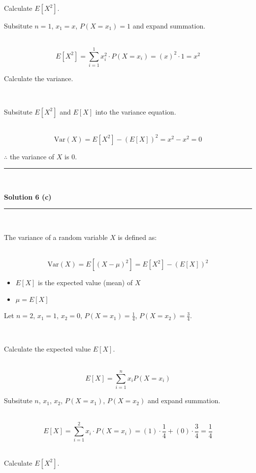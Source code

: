 \documentclass{article}
\begin{document}
\parbox{\textwidth}{Calculate $E[X^2]$.}

\parbox{\textwidth}{Subsitute $n=1$, $x_1=x$, $P(X = x_1) =1$ and expand summation.}\\

$$E[X^2] = \sum^1_{i=1} x_i^2 \cdot P(X = x_i) = (x)^2 \cdot 1 = x^2$$

\parbox{\textwidth}{Calculate the variance.}\\

\parbox{\textwidth}{Subsitute $E[X^2]$ and $E[X]$ into the variance equation.}\\

$$\text{Var}(X) = E[X^2] - (E[X])^2 = x^2 - x^2 = 0$$

\parbox{\textwidth}{$\therefore$ the variance of $X$ is 0.}

\noindent\rule{\textwidth}{0.4pt}\\

\newpage

\textbf{Solution 6 (c)}

\noindent\rule{\textwidth}{0.4pt}\\

\parbox{\textwidth}{The variance of a random variable $X$ is defined as:}\\

$$\text{Var}(X) = E[(X - \mu)^2] = E[X^2] - (E[X])^2$$

\begin{itemize}
    \item $E[X]$ is the expected value (mean) of $X$
    \item $\mu = E[X]$
\end{itemize}

\parbox{\textwidth}{Let $n = 2$, $x_1 = 1$, $x_2 = 0$, $P(X = x_1) = \frac{1}{4}$, $P(X = x_2) = \frac{3}{4}$.}\\

\parbox{\textwidth}{Calculate the expected value $E[X]$.}\\

$$E[X] = \sum^{n}_{i=1} x_i P(X = x_i)$$

\parbox{\textwidth}{Subsitute $n$, $x_1$, $x_2$, $P(X = x_1)$, $P(X = x_2)$ and expand summation.}\\

$$E[X] = \sum^2_{i=1} x_i \cdot P(X = x_i) = (1) \cdot \frac{1}{4} + (0) \cdot \frac{3}{4} = \frac{1}{4} $$\\

\parbox{\textwidth}{Calculate $E[X^2]$.}\\
\end{document}
